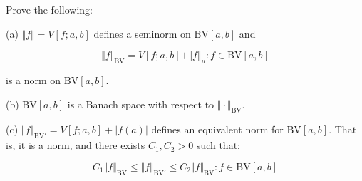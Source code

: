 \documentclass[10pt]{article}
\newcommand{\bv}{{\text{BV}}}
\newenvironment{problem}[2][Problem]{\begin{trivlist}
\item[\hskip \labelsep {\bfseries #1}\hskip \labelsep {\bfseries #2.}]}{\end{trivlist}}
\begin{document}
\begin{problem}{5.2.26}
Prove the following:

(a) $\Vert f \Vert = V[f;a,b]$ defines a seminorm on $\bv[a,b]$ and

$$ \Vert f \Vert_{\bv} = V[f;a,b] + \Vert f \Vert_u : f \in \bv[a,b]$$

is a norm on $\bv[a,b]$.

(b) $\bv[a,b]$ is a Banach space with respect to $\Vert \cdot \Vert_{\bv}$.

(c) $ \Vert f \Vert_{\bv'}  = V[f;a,b] + |f(a)|$ defines an equivalent norm for $\bv[a,b]$. That is, it is a norm, and there exists $C_1,C_2 > 0$ such that:

$$ C_1 \Vert f \Vert_{\bv} \leq \Vert f \Vert_{\bv'} \leq C_2 \Vert f \Vert_{\bv} : f \in \bv[a,b]$$

\end{problem}
\end{document}
